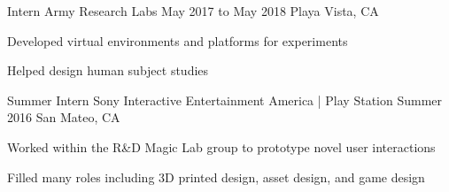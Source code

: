 \begin{cventries}
  \cventry
    {Intern} %
    {Army Research Labs} %
    {May 2017 to May 2018} %
    {Playa Vista, CA} %
    {
      \begin{cvitems} %
        \item {Developed virtual environments and platforms for experiments}
		\item {Helped design human subject studies}
      \end{cvitems}
    }

    
    
  \cventry
    {Summer Intern} %
    {Sony Interactive Entertainment America | Play Station} %
    {Summer 2016} %
    {San Mateo, CA} %
    {
      \begin{cvitems} %
        \item {Worked within the R\&D Magic Lab group to prototype novel user interactions}
		\item {Filled many roles including 3D printed design, asset design, and game design}
      \end{cvitems}
    }
    
    

\end{cventries}
